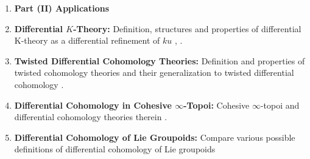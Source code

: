 \documentclass[10pt]{amsart}
\begin{document}
\begin{enumerate}[itemsep=0.3cm]
	\item[] \textbf{\large Part (II) Applications} 
	\item \textbf{Differential $K$-Theory:} Definition, structures and properties of differential K-theory as a differential refinement of $ku$ \cite[Section 7]{adh2021differentialcohomology}, \cite{hopkins2005quadratic,simonssullivan2008diffcoh,bunkenikolausvoelkl2016diffcoh}.
	\item \textbf{Twisted Differential Cohomology Theories:} Definition and properties of twisted cohomology theories \cite{atiyahsegal2004twistedktheory,abghr2014infty,abg2018thom,rosenberg2024twistedcohomology} and their generalization to twisted differential cohomology \cite{bunkenikolaus2019twisted}.
	\item \textbf{Differential Cohomology in Cohesive $\infty$-Topoi:} Cohesive $\infty$-topoi and differential cohomology theories therein \cite{schreiber2013differentialcohomology}.
	\item \textbf{Differential Cohomology of Lie Groupoids:} Compare various possible definitions of differential cohomology of Lie groupoids
\end{enumerate}

{\footnotesize


}
\end{document}
